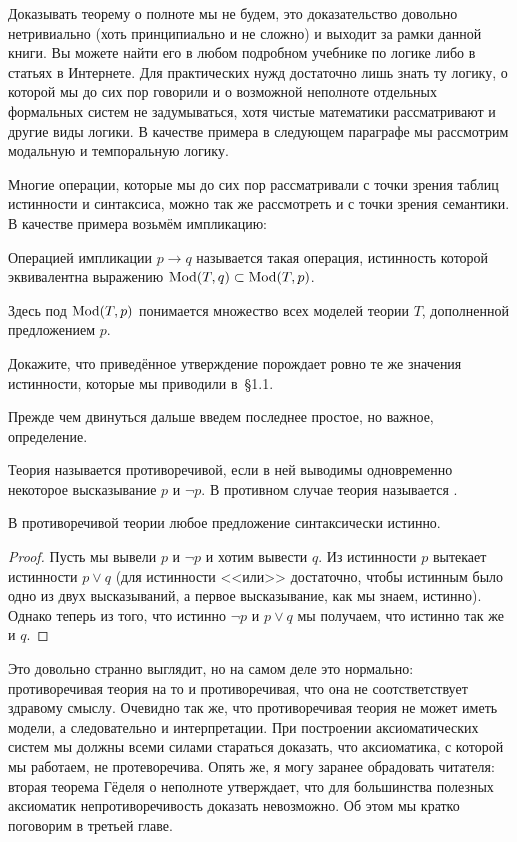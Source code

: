 Доказывать теорему о полноте мы не будем, это доказательство довольно нетривиально (хоть принципиально и не сложно) и выходит за рамки данной книги. Вы можете найти его в любом подробном учебнике по логике либо в статьях в Интернете. Для практических нужд достаточно лишь знать ту логику, о которой мы до сих пор говорили и о возможной неполноте отдельных формальных систем не задумываться, хотя чистые математики рассматривают и другие виды логики. В качестве примера в следующем параграфе мы рассмотрим модальную и темпоральную логику.

Многие операции, которые мы до сих пор рассматривали с точки зрения таблиц истинности и синтаксиса, можно так же рассмотреть и с точки зрения семантики.  В качестве примера возьмём импликацию:

\begin{definition}
Операцией импликации $p\to q$ называется такая операция, истинность которой эквивалентна выражению $\operatorname{Mod}(T, q)\subset\operatorname{Mod}(T, p)$.
\end{definition}

Здесь под $\operatorname{Mod}(T, p)$ понимается множество всех моделей теории $T$, дополненной предложением $p$.

\begin{exercise}
Докажите, что приведённое утверждение порождает ровно те же значения истинности, которые мы приводили в~\S1.1.
\end{exercise}

Прежде чем двинуться дальше введем последнее простое, но важное, определение.

\begin{definition}
Теория называется противоречивой, если в ней выводимы одновременно некоторое высказывание $p$ и $\neg p$. В противном случае теория называется .
\end{definition}

\begin{thm}
В противоречивой теории любое предложение синтаксически истинно.
\end{thm}
\begin{proof}
Пусть мы вывели $p$ и $\neg p$ и хотим вывести $q$. Из истинности $p$ вытекает истинности $p\lor q$ (для истинности <<или>> достаточно, чтобы истинным было одно из двух высказываний, а первое высказывание, как мы знаем, истинно). Однако теперь из того, что истинно $\neg p$ и $p\lor q$ мы получаем, что истинно так же и $q$.
\end{proof}

Это довольно странно выглядит, но на самом деле это нормально: противоречивая теория на то и противоречивая, что она не соотстветствует здравому смыслу. Очевидно так же, что противоречивая теория не может иметь модели, а следовательно и интерпретации. При построении аксиоматических систем мы должны всеми силами стараться доказать, что аксиоматика, с которой мы работаем, не протеворечива. Опять же, я могу заранее обрадовать читателя: вторая теорема Гёделя о неполноте утверждает, что для большинства полезных аксиоматик непротиворечивость доказать невозможно. Об этом мы кратко поговорим в третьей главе.

